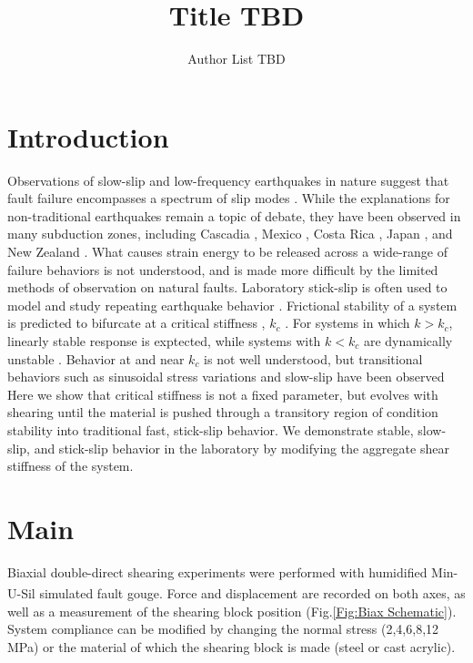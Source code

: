\documentclass[11pt]{article}
\title{Title TBD}
\author{Author List TBD}
\date{} %
\begin{document}
\maketitle

\section{Introduction}
Observations of slow-slip and low-frequency earthquakes in nature suggest that
fault failure encompasses a spectrum of slip modes \cite{Peng:2010, Ide:2007,
Beroza:2011}.  While the explanations for non-traditional earthquakes remain a
topic of debate, they have been observed in many subduction zones, including
Cascadia \cite{Miller:2002, Rogers:2003}, Mexico \cite{Kostoglodov:2003}, Costa
Rica \cite{Jiang:2012}, Japan \cite{Ito:2006}, and New Zealand
\cite{Wallace:2010}. What causes strain energy to be released across a
wide-range of failure behaviors is not understood, and is made more difficult by
the limited methods of observation on natural faults. Laboratory stick-slip is
often used to model and study repeating earthquake behavior \cite{Brace:1966,
Johnson:2013}. Frictional stability of a system is predicted to bifurcate at a
critical stiffness , $k_c$ \cite{Gu:1984}. For systems in which $k>k_c$,
linearly stable response is exptected, while systems with $k<k_c$ are
dynamically unstable \cite{Scholz:2002}. Behavior at and near $k_c$ is not well
understood, but transitional behaviors such as sinusoidal stress variations and
slow-slip have been observed \cite{Kaproth:2013, Baumberger:1994, Leeman:2015}
Here we show that critical stiffness is not a fixed parameter, but evolves with
shearing until the material is pushed through a transitory region of condition
stability into traditional fast, stick-slip behavior. We demonstrate stable,
slow-slip, and stick-slip behavior in the laboratory by modifying the aggregate
shear stiffness of the system.

\section{Main}
Biaxial double-direct shearing experiments were performed with humidified
Min-U-Sil\textsuperscript{\textregistered} simulated fault gouge. Force and
displacement are recorded on both axes, as well as a measurement of the shearing
block position (Fig.\ref{Fig:Biax Schematic}). System compliance can be modified
by changing the normal stress (2,4,6,8,12 MPa) or the material of which the
shearing block is made (steel or cast acrylic).
\end{document}
